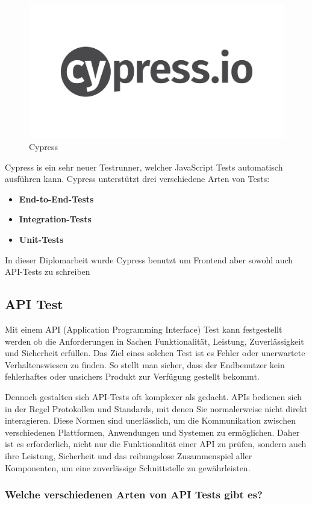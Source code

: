 \begin{figure}[h]
    \centering
    \includegraphics[width=0.5\linewidth]{pics/cypress-logo.png}
    \caption{Cypress}
    \label{fig:enter-label}
\end{figure}


Cypress is ein sehr neuer Testrunner, welcher JavaScript Tests automatisch ausführen kann.
Cypress unterstützt drei verschiedene Arten von Tests:

\begin{itemize}
\item \textbf{End-to-End-Tests}
\item \textbf{Integration-Tests}
\item \textbf{Unit-Tests}
\end{itemize}

In dieser Diplomarbeit wurde Cypress benutzt um Frontend aber sowohl auch API-Tests zu schreiben

\subsection{API Test}
Mit einem API (Application Programming Interface) Test kann festgestellt werden ob die Anforderungen in Sachen Funktionalität, Leistung, Zuverlässigkeit und Sicherheit erfüllen. Das Ziel eines solchen Test ist es Fehler oder unerwartete Verhaltenswiesen zu finden. So stellt man sicher, dass der Endbenutzer kein fehlerhaftes oder unsichers Produkt zur Verfügung gestellt bekommt. 

Dennoch gestalten sich API-Tests oft komplexer als gedacht. APIs bedienen sich in der Regel Protokollen und Standards, mit denen Sie normalerweise nicht direkt interagieren. Diese Normen sind unerlässlich, um die Kommunikation zwischen verschiedenen Plattformen, Anwendungen und Systemen zu ermöglichen. Daher ist es erforderlich, nicht nur die Funktionalität einer API zu prüfen, sondern auch ihre Leistung, Sicherheit und das reibungslose Zusammenspiel aller Komponenten, um eine zuverlässige Schnittstelle zu gewährleisten.

\subsubsection{Welche verschiedenen Arten von API Tests gibt es?}

